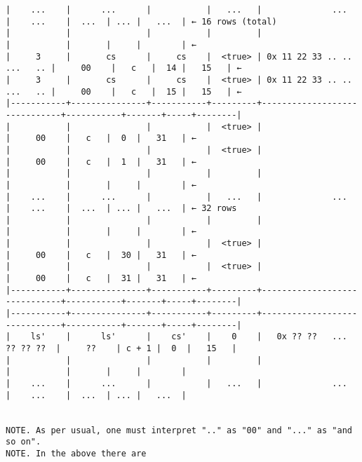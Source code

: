 \documentclass[varwidth=\maxdimen,margin=0.5cm,multi={verbatim}]{standalone}
\begin{document}
\begin{verbatim}
|    ...    |      ...      |           |   ...   |              ...             |    ...    |  ...  | ... |   ...  | ← 16 rows (total)
|           |               |           |         |                              |           |       |     |        | ←
|     3     |       cs      |     cs    |  <true> | 0x 11 22 33 .. ..   ...   .. |     00    |   c   |  14 |   15   | ←
|     3     |       cs      |     cs    |  <true> | 0x 11 22 33 .. ..   ...   .. |     00    |   c   |  15 |   15   | ←
|-----------+---------------+-----------+---------+------------------------------+-----------+-------+-----+--------|
|           |               |           |  <true> |                              |     00    |   c   |  0  |   31   | ←
|           |               |           |  <true> |                              |     00    |   c   |  1  |   31   | ←
|           |               |           |         |                              |           |       |     |        | ←
|    ...    |      ...      |           |   ...   |              ...             |    ...    |  ...  | ... |   ...  | ← 32 rows
|           |               |           |         |                              |           |       |     |        | ←
|           |               |           |  <true> |                              |     00    |   c   |  30 |   31   | ←
|           |               |           |  <true> |                              |     00    |   c   |  31 |   31   | ←
|-----------+---------------+-----------+---------+------------------------------+-----------+-------+-----+--------|
|-----------+---------------+-----------+---------+------------------------------+-----------+-------+-----+--------|
|    ls'    |      ls'      |    cs'    |    0    |   0x ?? ??   ...   ?? ?? ??  |     ??    | c + 1 |  0  |   15   |
|           |               |           |         |                              |           |       |     |        |
|    ...    |      ...      |           |   ...   |              ...             |    ...    |  ...  | ... |   ...  |


NOTE. As per usual, one must interpret ".." as "00" and "..." as "and so on".
NOTE. In the above there are
\end{verbatim}
\end{document}
